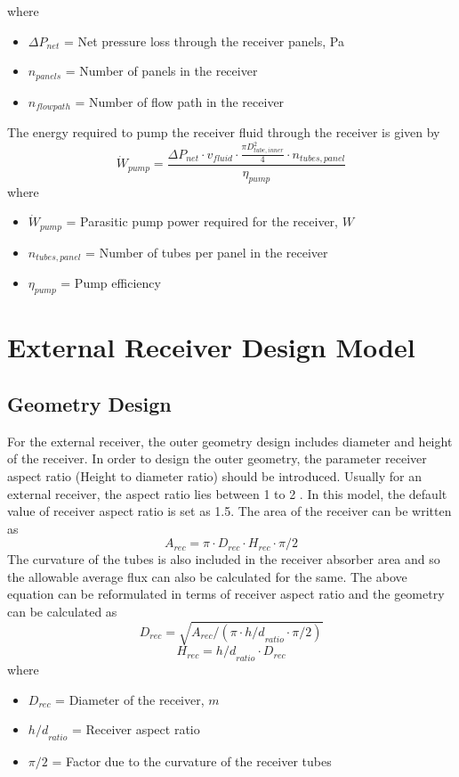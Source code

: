 where
\begin{itemize}
	\item $\Delta P_{net}$ = Net pressure loss through the receiver panels, Pa
	\item $n_{panels}$ = Number of panels in the receiver
	\item $n_{flow path}$ = Number of flow path in the receiver
\end{itemize}  
The energy required to pump the receiver fluid through the receiver is given by
\begin{equation}
\dot W_{pump}= \frac {\Delta P_{net}\cdot v_{fluid}\cdot \frac {\pi D_{tube,inner}^2}{4}\cdot n_{tubes,panel}}{\eta_{pump}}
\end{equation}
where 
\begin{itemize}
	\item $\dot W_{pump}$ = Parasitic pump power required for the receiver, $W$
	\item $n_{tubes,panel}$ = Number of tubes per panel in the receiver
	\item $\eta_{pump}$ = Pump efficiency
\end{itemize}
\section{External Receiver Design Model}
\subsection{Geometry Design}
For the external receiver, the outer geometry design includes diameter and height of the receiver. In order to design the outer geometry, the parameter receiver aspect ratio (Height to diameter ratio) should be introduced. Usually for an external receiver, the aspect ratio lies between 1 to 2 \cite{Falcone.1986}. In this model, the default value of receiver aspect ratio is set as 1.5. The area of the receiver can be written as \\
\begin{equation}
	A_{rec} = \pi \cdot D_{rec} \cdot H_{rec} \cdot \pi / 2
\end{equation}
The curvature of the tubes is also included in the receiver absorber area and so the allowable average flux can also be calculated for the same. The above equation can be reformulated in terms of receiver aspect ratio and the geometry can be calculated as\\
\begin{equation}
	D_{rec} = \sqrt{A_{rec} / (\pi \cdot {h/d}_{ratio} \cdot \pi / 2)}
\end{equation}
\begin{equation}
	H_{rec} = {h/d}_{ratio} \cdot D_{rec}
\end{equation}
where 
\begin{itemize}
	\item $D_{rec}$ = Diameter of the receiver, $m$
	\item ${h/d}_{ratio}$ = Receiver aspect ratio
	\item $\pi / 2$ = Factor due to the curvature of the receiver tubes
\end{itemize}
